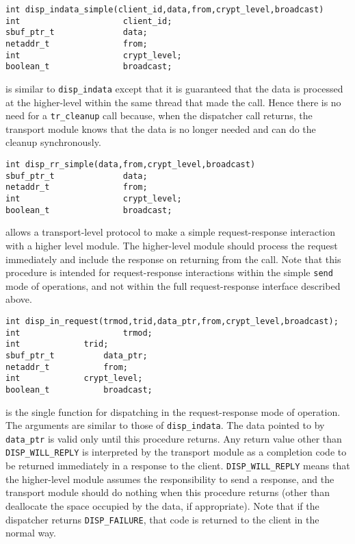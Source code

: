 \begin{verbatim}
int disp_indata_simple(client_id,data,from,crypt_level,broadcast)
int                     client_id;
sbuf_ptr_t              data;
netaddr_t               from;
int                     crypt_level;
boolean_t               broadcast;
\end{verbatim}
is similar to \verb"disp_indata" except that it is guaranteed that the data
is processed at the higher-level within the same thread that made the call.
Hence there is no need for a \verb"tr_cleanup" call because, when the
dispatcher call returns, the transport module knows that the data is no
longer needed and can do the cleanup synchronously.

\begin{verbatim}
int disp_rr_simple(data,from,crypt_level,broadcast)
sbuf_ptr_t              data;
netaddr_t               from;
int                     crypt_level;
boolean_t               broadcast;
\end{verbatim}
allows a transport-level protocol to make a simple request-response
interaction with a higher level module.  The higher-level module should
process the request immediately and include the response on returning from
the call. Note that this procedure is intended for request-response
interactions within the simple \verb"send" mode of operations, and not
within the full request-response interface described above.

\begin{verbatim}
int disp_in_request(trmod,trid,data_ptr,from,crypt_level,broadcast);
int                     trmod;
int		        trid;
sbuf_ptr_t	        data_ptr;
netaddr_t	        from;
int		        crypt_level;
boolean_t	        broadcast;
\end{verbatim}
is the single function for dispatching in the request-response mode of
operation. The arguments are similar to those of \verb"disp_indata".
The data pointed to by \verb"data_ptr" is valid only until this
procedure returns.  Any return value other than \verb"DISP_WILL_REPLY"
is interpreted by the transport module as a completion code to be
returned immediately in a response to the client.
\verb"DISP_WILL_REPLY" means that the higher-level module assumes the
responsibility to send a response, and the transport module should do
nothing when this procedure returns (other than deallocate the space
occupied by the data, if appropriate). Note that if the dispatcher
returns \verb"DISP_FAILURE", that code is returned to the client in
the normal way.

